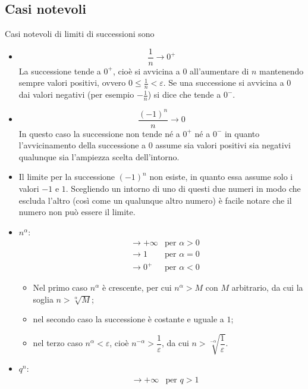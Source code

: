 \subsection{Casi notevoli}
Casi notevoli di limiti di successioni sono
\begin{itemize}
	\item
	      \begin{equation}
		      \frac{1}{n}\to 0^+
	      \end{equation}
	      La successione tende a $0^+$, cioè si avvicina a $0$ all'aumentare di $n$ mantenendo sempre valori positivi, ovvero $0\leq\frac{1}{n}<\varepsilon$. Se una successione si avvicina a $0$ dai valori negativi (per esempio $-\frac{1}{n}$) si dice che tende a $0^-$.
	\item
	      \begin{equation}
		      \frac{(-1)^n}{n}\to 0
	      \end{equation}
	      In questo caso la successione non tende né a $0^+$ né a $0^-$ in quanto l'avvicinamento della successione a $0$ assume sia valori positivi sia negativi qualunque sia l'ampiezza scelta dell'intorno.
	\item Il limite per la successione $(-1)^n$ non esiste, in quanto essa assume solo i valori $-1$ e $1$. Scegliendo un intorno di uno di questi due numeri in modo che escluda l'altro (così come un qualunque altro numero) è facile notare che il numero non può essere il limite.
	\item $n^\alpha$:
	      \begin{align}
		       & \to +\infty & \text{per }\alpha>0 \\
		       & \to 1       & \text{per }\alpha=0 \\
		       & \to 0^+     & \text{per }\alpha<0
	      \end{align}
	      \begin{itemize}
		      \item Nel primo caso $n^\alpha$ è crescente, per cui $n^\alpha>M$ con $M$ arbitrario, da cui la soglia $n>\sqrt[\alpha]{M}$;
		      \item nel secondo caso la successione è costante e uguale a $1$;
		      \item nel terzo caso $n^\alpha<\varepsilon$, cioè $n^{-\alpha} > \dfrac{1}{\varepsilon}$, da cui $n>\sqrt[-\alpha]{\dfrac{1}{\varepsilon}}$.
	      \end{itemize}
	\item $q^n$:
	      \begin{align}
		       & \to +\infty & \text{per }q>1       \label{eq:limnot3a} \\

\end{align}
\end{itemize}

